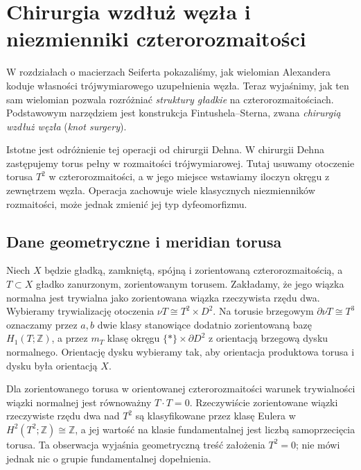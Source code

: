 \chapter{Chirurgia wzdłuż węzła i niezmienniki czterorozmaitości}
\label{ch:tg-knot-surgery}

W rozdziałach o macierzach Seiferta pokazaliśmy, jak wielomian
Alexandera koduje własności trójwymiarowego uzupełnienia węzła.
Teraz wyjaśnimy, jak ten sam wielomian pozwala rozróżniać
\emph{struktury gładkie} na czterorozmaitościach. Podstawowym
narzędziem jest konstrukcja Fintushela--Sterna, zwana
\emph{chirurgią wzdłuż węzła} (\emph{knot surgery}).

Istotne jest odróżnienie tej operacji od chirurgii Dehna.
W chirurgii Dehna zastępujemy torus pełny w rozmaitości
trójwymiarowej. Tutaj usuwamy otoczenie torusa $T^2$ w
czterorozmaitości, a w jego miejsce wstawiamy iloczyn okręgu
z zewnętrzem węzła. Operacja zachowuje wiele klasycznych
niezmienników rozmaitości, może jednak zmienić jej typ
dyfeomorfizmu.

\section{Dane geometryczne i meridian torusa}
\label{sec:tg-ks-data}

\begin{definicja}
Niech $X$ będzie gładką, zamkniętą, spójną i zorientowaną
czterorozmaitością, a $T\subset X$ gładko zanurzonym,
zorientowanym torusem. Zakładamy, że jego wiązka normalna
jest trywialna jako zorientowana wiązka rzeczywista
rzędu dwa. Wybieramy trywializację otoczenia
$\nu T\cong T^2\times D^2$. Na torusie brzegowym
$\partial\nu T\cong T^3$ oznaczamy przez $a,b$ dwie
klasy stanowiące dodatnio zorientowaną bazę
$H_1(T;\mathbb Z)$, a przez $m_T$ klasę okręgu
$\{*\}\times\partial D^2$ z orientacją brzegową
dysku normalnego. Orientację dysku wybieramy tak,
aby orientacja produktowa torusa i dysku była
orientacją $X$.
\end{definicja}

Dla zorientowanego torusa w orientowanej czterorozmaitości
warunek trywialności wiązki normalnej jest równoważny
$T\cdot T=0$. Rzeczywiście zorientowane wiązki
rzeczywiste rzędu dwa nad $T^2$ są klasyfikowane
przez klasę Eulera w $H^2(T^2;\mathbb Z)\cong\mathbb Z$,
a jej wartość na klasie fundamentalnej jest
liczbą samoprzecięcia torusa. Ta obserwacja
wyjaśnia geometryczną treść założenia $T^2=0$;
nie mówi jednak nic o grupie fundamentalnej dopełnienia.

